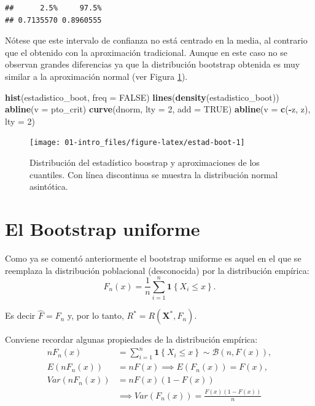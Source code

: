 \documentclass[]{book}
\newenvironment{Shaded}{\begin{snugshade}}{\end{snugshade}}
\newcommand{\KeywordTok}[1]{\textcolor[rgb]{0.13,0.29,0.53}{\textbf{#1}}}
\newcommand{\DataTypeTok}[1]{\textcolor[rgb]{0.13,0.29,0.53}{#1}}
\newcommand{\DecValTok}[1]{\textcolor[rgb]{0.00,0.00,0.81}{#1}}
\newcommand{\OtherTok}[1]{\textcolor[rgb]{0.56,0.35,0.01}{#1}}
\newcommand{\OperatorTok}[1]{\textcolor[rgb]{0.81,0.36,0.00}{\textbf{#1}}}
\newcommand{\NormalTok}[1]{#1}
\theoremstyle{definition}
\theoremstyle{definition}
\theoremstyle{definition}
\theoremstyle{remark}
\begin{document}
\begin{verbatim}
##      2.5%     97.5% 
## 0.7135570 0.8960555
\end{verbatim}

Nótese que este intervalo de confianza no está centrado en la media, al
contrario que el obtenido con la aproximación tradicional. Aunque en
este caso no se observan grandes diferencias ya que la distribución
bootstrap obtenida es muy similar a la aproximación normal (ver Figura
\ref{fig:estad-boot}).

\begin{Shaded}
\begin{Highlighting}[]
\KeywordTok{hist}\NormalTok{(estadistico_boot, }\DataTypeTok{freq =} \OtherTok{FALSE}\NormalTok{)}
\KeywordTok{lines}\NormalTok{(}\KeywordTok{density}\NormalTok{(estadistico_boot))}
\KeywordTok{abline}\NormalTok{(}\DataTypeTok{v =}\NormalTok{ pto_crit)}
\KeywordTok{curve}\NormalTok{(dnorm, }\DataTypeTok{lty =} \DecValTok{2}\NormalTok{, }\DataTypeTok{add =} \OtherTok{TRUE}\NormalTok{)}
\KeywordTok{abline}\NormalTok{(}\DataTypeTok{v =} \KeywordTok{c}\NormalTok{(}\OperatorTok{-}\NormalTok{z, z), }\DataTypeTok{lty =} \DecValTok{2}\NormalTok{)}
\end{Highlighting}
\end{Shaded}

\begin{figure}[!htb]

{\centering \texttt{[image: 01-intro\_files/figure-latex/estad-boot-1]} 

}

\caption{Distribución del estadístico boostrap y aproximaciones de los cuantiles. Con línea discontinua se muestra la distribución normal asintótica.}\label{fig:estad-boot}
\end{figure}

\section{El Bootstrap uniforme}\label{cap1-unif}

Como ya se comentó anteriormente el bootstrap uniforme es aquel en el
que se reemplaza la distribución poblacional (desconocida) por la
distribución empírica:
\[F_n\left( x \right) =\frac{1}{n}\sum_{i=1}^{n}\mathbf{1}\left\{ X_i\leq x\right\}.\]

Es decir \(\hat{F}=F_n\) y, por lo tanto,
\(R^{\ast}=R\left( \mathbf{X}^{\ast},F_n \right)\).

Conviene recordar algunas propiedades de la distribución empírica:
\[\begin{aligned}
nF_n\left( x \right) &= \sum_{i=1}^{n}\mathbf{1}\left\{ X_i\leq x\right\}
\sim \mathcal{B}\left( n,F\left( x \right) \right), \\
E\left( nF_n\left( x \right) \right) &= nF\left( x \right) \implies E\left(
F_n\left( x \right) \right) =F\left( x \right), \\
Var\left( nF_n\left( x \right) \right) &=  nF\left( x \right) \left(
1-F\left( x \right) \right) \\
&\implies  Var\left( F_n\left( x \right) \right) =\frac{F\left( x \right) \left( 1-F\left( x \right) \right)}{n}
\end{aligned}\]
\end{document}
